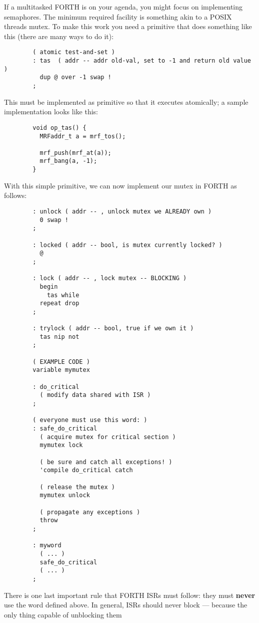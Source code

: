 \documentclass{article}
\begin{document}
If a multitasked FORTH is on your agenda, you might focus on
implementing semaphores. The minimum required facility is something
akin to a POSIX threads mutex. To make this work you need a primitive
that does something like this (there are many ways to do it):
\begin{verbatim}
        ( atomic test-and-set )
        : tas  ( addr -- addr old-val, set to -1 and return old value )
          dup @ over -1 swap !
        ;
\end{verbatim}
This must be implemented as primitive so that it executes atomically; a
sample implementation looks like this:
\begin{verbatim}
        void op_tas() {
          MRFaddr_t a = mrf_tos();

          mrf_push(mrf_at(a));
          mrf_bang(a, -1);
        }
\end{verbatim}
With this simple primitive, we can now implement our mutex in FORTH as
follows:
\begin{verbatim}
        : unlock ( addr -- , unlock mutex we ALREADY own )
          0 swap !
        ;

        : locked ( addr -- bool, is mutex currently locked? )
          @
        ;

        : lock ( addr -- , lock mutex -- BLOCKING )
          begin
            tas while
          repeat drop
        ;

        : trylock ( addr -- bool, true if we own it )
          tas nip not
        ;

        ( EXAMPLE CODE )
        variable mymutex

        : do_critical
          ( modify data shared with ISR )
        ;

        ( everyone must use this word: )
        : safe_do_critical
          ( acquire mutex for critical section )
          mymutex lock

          ( be sure and catch all exceptions! )
          'compile do_critical catch

          ( release the mutex )
          mymutex unlock

          ( propagate any exceptions )
          throw
        ;

        : myword
          ( ... )
          safe_do_critical
          ( ... )
        ;
\end{verbatim}
There is one last important rule that FORTH ISRs must follow: they must
\textbf{never} use the word  defined above. In general, ISRs
should never block --- because the only thing capable of unblocking them
\end{document}
